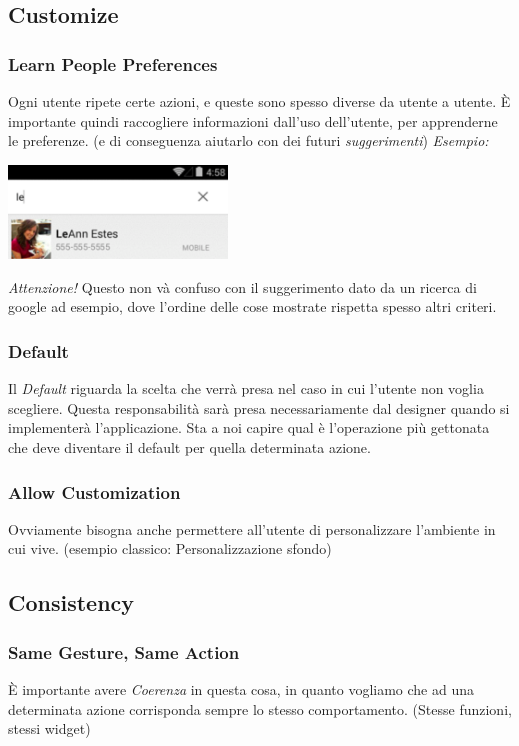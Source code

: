\documentclass[oneside]{book}
\begin{document}
		\subsection{Customize}

			\subsubsection{Learn People Preferences}
				Ogni utente ripete certe azioni, e queste sono spesso diverse da utente a utente. È importante quindi raccogliere informazioni dall'uso dell'utente, per apprenderne le preferenze. (e di conseguenza aiutarlo con dei futuri \emph{suggerimenti}) \emph{Esempio:}
				\begin{center}
				\includegraphics[height = 25mm]{images/suggest.png}
				\end{center}

				\emph{Attenzione!} Questo non và confuso con il suggerimento dato da un ricerca di google ad esempio, dove l'ordine delle cose mostrate rispetta spesso altri criteri.

			\subsubsection{Default}
				Il \emph{Default} riguarda la scelta che verrà presa nel caso in cui l'utente non voglia scegliere. Questa responsabilità sarà presa necessariamente dal designer quando si implementerà l'applicazione. Sta a noi capire qual è l'operazione più gettonata che deve diventare il default per quella determinata azione.

			\subsubsection{Allow Customization}
				Ovviamente bisogna anche permettere all'utente di personalizzare l'ambiente in cui vive. (esempio classico: Personalizzazione sfondo)

		\subsection{Consistency}

			\subsubsection{Same Gesture, Same Action}
				È importante avere \emph{Coerenza} in questa cosa, in quanto vogliamo che ad una determinata azione corrisponda sempre lo stesso comportamento. (Stesse funzioni, stessi widget) \\
\end{document}
